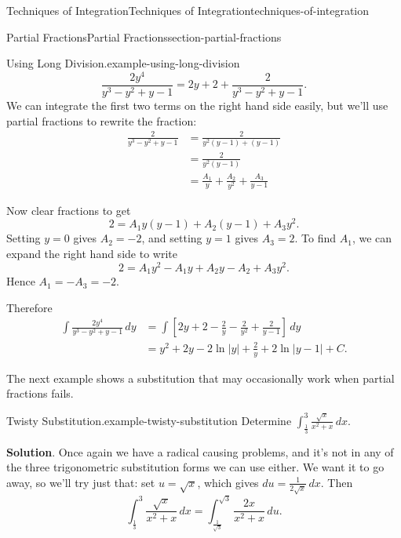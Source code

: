 \documentclass[oneside,10pt,]{book}
\numberwithin{equation}{section}
\begin{document}
\begin{chapterptx}{Techniques of Integration}{}{Techniques of Integration}{}{}{techniques-of-integration}
\begin{sectionptx}{Partial Fractions}{}{Partial Fractions}{}{}{section-partial-fractions}
\begin{example}{Using Long Division.}{example-using-long-division}
\begin{equation*}
\frac{2y^{4}}{y^{3} - y^{2} + y - 1} = 2y + 2 + \frac{2}{y^{3} - y^{2} + y - 1}.
\end{equation*}
We can integrate the first two terms on the right hand side easily, but we'll use partial fractions to rewrite the fraction:%
\begin{align*}
\frac{2}{y^{3} - y^{2} + y - 1} & = \frac{2}{y^{2}(y - 1) + (y - 1)} \\
& = \frac{2}{y^{2}(y - 1)} \\
& = \frac{A_{1}}{y} + \frac{A_{2}}{y^{2}} + \frac{A_{3}}{y - 1} 
\end{align*}
%
\par
\hypertarget{p-569}{}%
Now clear fractions to get%
\begin{equation*}
2 = A_{1}y(y-1) + A_{2}(y-1) + A_{3}y^{2}.
\end{equation*}
Setting \(y = 0\) gives \(A_{2} = -2\), and setting \(y = 1\) gives \(A_{3} = 2\). To find \(A_{1}\), we can expand the right hand side to write%
\begin{equation*}
2 = A_{1}y^{2} - A_{1}y + A_{2}y - A_{2} + A_{3}y^{2}.
\end{equation*}
Hence \(A_{1} = -A_{3} = -2\).%
\par
\hypertarget{p-570}{}%
Therefore%
\begin{align*}
\int\frac{2y^{4}}{y^{3} - y^{2} + y - 1}\,dy & = \int\left[2y + 2 - \frac{2}{y} - \frac{2}{y^{2}} + \frac{2}{y - 1}\right]\,dy  \\
& = y^{2} + 2y - 2\ln|y| + \frac{2}{y} + 2\ln|y-1| + C. 
\end{align*}
%
\end{example}
\hypertarget{p-571}{}%
The next example shows a substitution that may occasionally work when partial fractions fails.%
\begin{example}{Twisty Substitution.}{example-twisty-substitution}%
\hypertarget{p-572}{}%
Determine \(\int_{\frac{1}{3}}^{3}\frac{\sqrt{x}}{x^{2} + x}\,dx.\)%
\par\smallskip%
\noindent\textbf{Solution}.\hypertarget{solution-125}{}\quad%
\hypertarget{p-573}{}%
Once again we have a radical causing problems, and it's not in any of the three trigonometric substitution forms we can use either. We want it to go away, so we'll try just that: set \(u = \sqrt{x}\), which gives \(du = \frac{1}{2\sqrt{x}}\,dx\). Then%
\begin{equation*}
\int_{\frac{1}{3}}^{3}\frac{\sqrt{x}}{x^{2} + x}\,dx = \int_{\frac{1}{\sqrt{3}}}^{\sqrt{3}}\frac{2x}{x^{2} + x}\,du.

\end{equation*}
\end{example}
\end{sectionptx}
\end{chapterptx}
\end{document}
